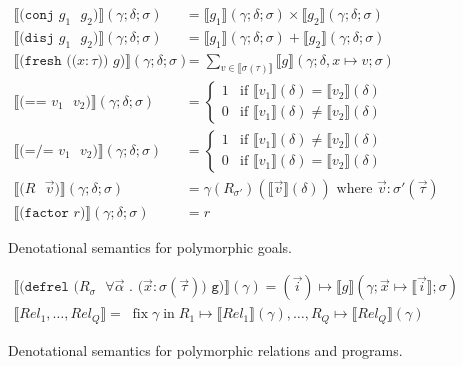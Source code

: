 \documentclass{report}
\theoremstyle{definition}
\newcommand{\den}[1]{\llbracket #1 \rrbracket}
\begin{document}
\begin{figure}
\begin{align*}
	\den{\texttt{(conj \(g_1\) \(g_2\))}} (\gamma;\delta;\sigma) &= \den{g_1} (\gamma;\delta;\sigma) \times \den{g_2} (\gamma;\delta;\sigma) \\
	\den{\texttt{(disj \(g_1\) \(g_2\))}} (\gamma;\delta;\sigma) &= \den{g_1} (\gamma;\delta;\sigma) + \den{g_2} (\gamma;\delta;\sigma) \\
	\den{\texttt{(fresh ((\(x : \tau\))) \(g\))}} (\gamma;\delta;\sigma) &= \sum_{v \in \den{\sigma(\tau)}} \den{g} (\gamma;\delta,x \mapsto v;\sigma) \\
	\den{\texttt{(== \(v_1\) \(v_2\))}} (\gamma;\delta;\sigma) &=
	\begin{cases}
		1 & \textrm{if } \den{v_1} (\delta) = \den{v_2} (\delta) \\
		0 & \textrm{if } \den{v_1} (\delta) \ne \den{v_2} (\delta)
	\end{cases} \\
	\den{\texttt{(=/= \(v_1\) \(v_2\))}} (\gamma;\delta;\sigma) &=
	\begin{cases}
		1 & \textrm{if } \den{v_1} (\delta) \ne \den{v_2} (\delta) \\
		0 & \textrm{if } \den{v_1} (\delta) = \den{v_2} (\delta)
	\end{cases} \\
	\den{\texttt{(\(R\) \(\vec v\))}} (\gamma;\delta;\sigma) &= \gamma(R_{\sigma'})(\den{\vec v}(\delta))
	\textrm{ where } \vec v : \sigma'(\vec\tau) \\
	\den{\texttt{(factor \(r\))}} (\gamma;\delta;\sigma) &= r
\end{align*}
\caption{Denotational semantics for polymorphic goals.}
	\label{fig:poly-goals-semantics}
\end{figure}

\begin{figure}
\begin{gather*}
	\den{\texttt{(defrel (\(R_{\sigma}\) \(\forall \vec \alpha\) . (\(\vec x : \sigma (\vec \tau)\)) g)}} (\gamma) =
	(\vec i) \mapsto \den{g} (\gamma; \vec x \mapsto \den{\vec i};\sigma) \\
	\den{\textit{Rel}_1, \dots, \textit{Rel}_Q} = \;
	\mathrel{\textrm{fix}} \gamma \mathrel{\textrm{in}} R_1 \mapsto \den{\textit{Rel}_1} (\gamma), \dots, R_Q \mapsto \den{\textit{Rel}_Q} (\gamma)
\end{gather*}
\caption{Denotational semantics for polymorphic relations and programs.}
	\label{fig:poly-relations-semantics}
\end{figure}
\end{document}
